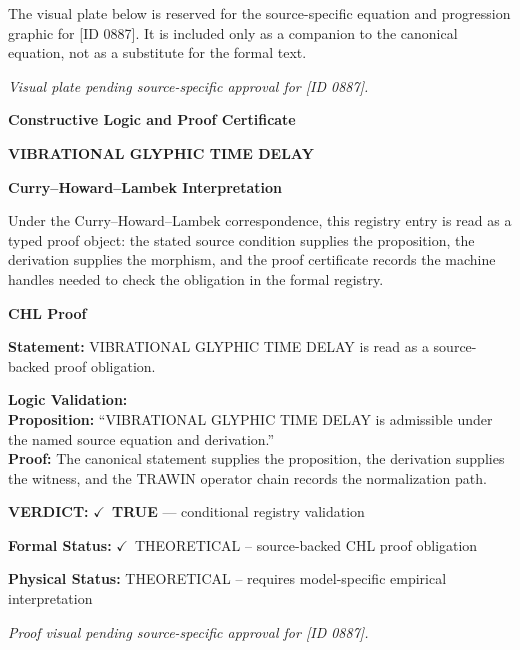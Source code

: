 \begingroup\footnotesize\sloppy
The visual plate below is reserved for the source-specific equation and progression graphic for [ID 0887]. It is included only as a companion to the canonical equation, not as a substitute for the formal text.
\par\endgroup
\begingroup\footnotesize\itshape
Visual plate pending source-specific approval for [ID 0887].
\par\endgroup

\clearpage
\begingroup\tzpsupportsetup
\noindent\textbf{\fontsize{10.8pt}{12.8pt}\selectfont [ID 0887] Constructive Logic and Proof Certificate}\par
\noindent\textbf{\fontsize{10pt}{12pt}\selectfont VIBRATIONAL GLYPHIC TIME DELAY}\par
\vspace{0.45em}
\begingroup
\footnotesize
\setlength{\parskip}{0.22em}
\setlength{\parindent}{0pt}
\noindent\textbf{Curry--Howard--Lambek Interpretation}\par
Under the Curry--Howard--Lambek correspondence, this registry entry is read as a typed proof
object: the stated source condition supplies the proposition, the derivation supplies the
morphism, and the proof certificate records the machine handles needed to check the obligation
in the formal registry.

\vspace{0.45em}
\noindent\textbf{CHL Proof}\par
\textbf{Statement:} VIBRATIONAL GLYPHIC TIME DELAY is read as a source-backed proof obligation.

\textbf{Logic Validation:}\\
\textbf{Proposition:} ``VIBRATIONAL GLYPHIC TIME DELAY is admissible under the named source equation and derivation.''\\
\textbf{Proof:} The canonical statement supplies the proposition, the derivation supplies the witness, and the TRAWIN operator chain records the normalization path.

\textbf{VERDICT:} \ensuremath{\checkmark}\ \textbf{TRUE} --- conditional registry validation

\textbf{Formal Status:} \ensuremath{\checkmark}\ THEORETICAL -- source-backed CHL proof obligation

\textbf{Physical Status:} THEORETICAL -- requires model-specific empirical interpretation
\par\vspace{0.45em}
\par
\vfill
\begingroup\footnotesize\itshape
Proof visual pending source-specific approval for [ID 0887].
\par\endgroup
\vfill
\endgroup
\endgroup
